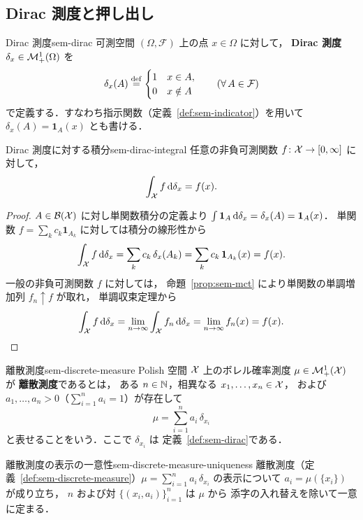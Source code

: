 \subsection{Dirac 測度と押し出し}
\label{sec:sem-dirac-pushforward}

\begin{definition}{Dirac 測度}{sem-dirac}
  可測空間 $(\Omega, \mathcal{F})$ 上の点 $x \in \Omega$ に対して，
  \textbf{Dirac 測度} $\delta_x \in \mathcal{M}_+^1(\Omega)$ を
  \[
    \delta_x(A) \overset{\mathrm{def}}{=}
    \begin{cases}
      1 & x \in A, \\
      0 & x \notin A
    \end{cases}
    \qquad (\forall\, A \in \mathcal{F})
  \]
  で定義する．すなわち指示関数（定義~\ref{def:sem-indicator}）を用いて
  $\delta_x(A) = \mathbf{1}_A(x)$ とも書ける．
\end{definition}

\begin{claim}{Dirac 測度に対する積分}{sem-dirac-integral}
  任意の非負可測関数 $f \colon \mathcal{X} \to [0, \infty]$ に対して，
  \[
    \int_{\mathcal{X}} f \, \mathrm{d}\delta_x = f(x).
  \]
\end{claim}

\begin{proof}
  $A \in \mathcal{B}(\mathcal{X})$ に対し単関数積分の定義より
  $\int \mathbf{1}_A \, \mathrm{d}\delta_x = \delta_x(A) = \mathbf{1}_A(x)$．
  単関数 $f = \sum_k c_k \mathbf{1}_{A_k}$ に対しては積分の線形性から
  \[
    \int_{\mathcal{X}} f \, \mathrm{d}\delta_x
    = \sum_k c_k \, \delta_x(A_k)
    = \sum_k c_k \, \mathbf{1}_{A_k}(x)
    = f(x).
  \]
  一般の非負可測関数 $f$ に対しては，
  命題~\ref{prop:sem-mct} により単関数の単調増加列 $f_n \uparrow f$ が取れ，
  単調収束定理から
  \[
    \int_{\mathcal{X}} f \, \mathrm{d}\delta_x
    = \lim_{n \to \infty} \int_{\mathcal{X}} f_n \, \mathrm{d}\delta_x
    = \lim_{n \to \infty} f_n(x)
    = f(x).
  \]
\end{proof}

\begin{definition}{離散測度}{sem-discrete-measure}
  Polish 空間 $\mathcal{X}$ 上のボレル確率測度 $\mu \in \mathcal{M}_+^1(\mathcal{X})$ が
  \textbf{離散測度}であるとは，
  ある $n \in \mathbb{N}$，相異なる $x_1, \ldots, x_n \in \mathcal{X}$，
  および $a_1, \ldots, a_n > 0$（$\sum_{i=1}^n a_i = 1$）が存在して
  \[
    \mu = \sum_{i=1}^{n} a_i\, \delta_{x_i}
  \]
  と表せることをいう．ここで $\delta_{x_i}$ は
  定義~\ref{def:sem-dirac}である．
\end{definition}

\begin{claim}{離散測度の表示の一意性}{sem-discrete-measure-uniqueness}
  離散測度（定義~\ref{def:sem-discrete-measure}）$\mu = \sum_{i=1}^{n} a_i\, \delta_{x_i}$ の表示について
  $a_i = \mu(\{x_i\})$ が成り立ち，
  $n$ および対 $\{(x_i, a_i)\}_{i=1}^{n}$ は $\mu$ から
  添字の入れ替えを除いて一意に定まる．
\end{claim}

